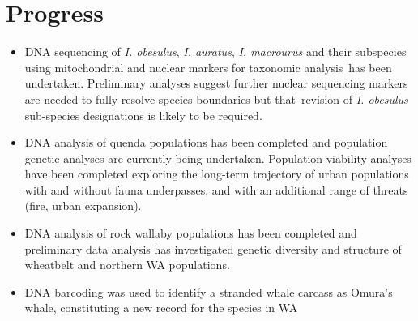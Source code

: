 \documentclass[version=last, paper=a4, DIV=18, usenames, dvipsnames]{scrartcl}
\begin{document}
\section*{Progress}
\begin{itemize}
\itemsep1pt\parskip0pt
\item
  DNA sequencing of \emph{I. obesulus}, \emph{I. auratus}, \emph{I.
  macrourus} and their subspecies using mitochondrial and nuclear
  markers for taxonomic analysis~has been undertaken. Preliminary
  analyses suggest further nuclear sequencing markers are needed to
  fully resolve species boundaries but that~revision of \emph{I.
  obesulus} sub-species designations is likely to be required.
\item
  DNA analysis of quenda populations has been completed and population
  genetic analyses are currently being undertaken. Population viability
  analyses have been completed exploring the long-term trajectory of
  urban populations with and without fauna underpasses, and with an
  additional range of threats (fire, urban expansion).
\item
  DNA analysis of rock wallaby populations has been completed and
  preliminary data analysis has investigated genetic diversity and
  structure of wheatbelt and northern WA populations.
\item
  DNA barcoding was used to identify a stranded whale carcass as Omura's
  whale, constituting a new record for the species in WA~
\end{itemize}
\end{document}
